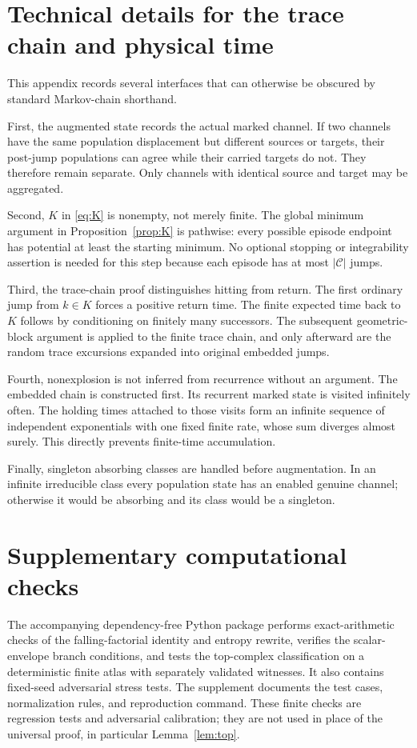 \appendix
\section{Technical details for the trace chain and physical time}\label{app:trace}

This appendix records several interfaces that can otherwise be obscured by
standard Markov-chain shorthand.

First, the augmented state records the actual marked channel.  If two
channels have the same population displacement but different sources or
targets, their post-jump populations can agree while their carried targets do
not.  They therefore remain separate.  Only channels with identical source
and target may be aggregated.

Second, \(K\) in \eqref{eq:K} is nonempty, not merely finite.  The global
minimum argument in Proposition~\ref{prop:K} is pathwise: every possible
episode endpoint has potential at least the starting minimum.  No optional
stopping or integrability assertion is needed for this step because each
episode has at most \(|\mathcal C|\) jumps.

Third, the trace-chain proof distinguishes hitting from return.  The first
ordinary jump from \(k\in K\) forces a positive return time.  The finite
expected time back to \(K\) follows by conditioning on finitely many
successors.  The subsequent geometric-block argument is applied to the
finite trace chain, and only afterward are the random trace excursions
expanded into original embedded jumps.

Fourth, nonexplosion is not inferred from recurrence without an argument.
The embedded chain is constructed first.  Its recurrent marked state is
visited infinitely often.  The holding times attached to those visits form
an infinite sequence of independent exponentials with one fixed finite rate,
whose sum diverges almost surely.  This directly prevents finite-time
accumulation.

Finally, singleton absorbing classes are handled before augmentation.  In an
infinite irreducible class every population state has an enabled genuine
channel; otherwise it would be absorbing and its class would be a singleton.

\section{Supplementary computational checks}\label{app:verification}

The accompanying dependency-free Python package performs exact-arithmetic
checks of the falling-factorial identity and entropy rewrite, verifies the
scalar-envelope branch conditions, and tests the top-complex classification
on a deterministic finite atlas with separately validated witnesses.  It also
contains fixed-seed adversarial stress tests.  The supplement documents the
test cases, normalization rules, and reproduction command.  These finite
checks are regression tests and adversarial calibration; they are not used in
place of the universal proof, in particular Lemma~\ref{lem:top}.



